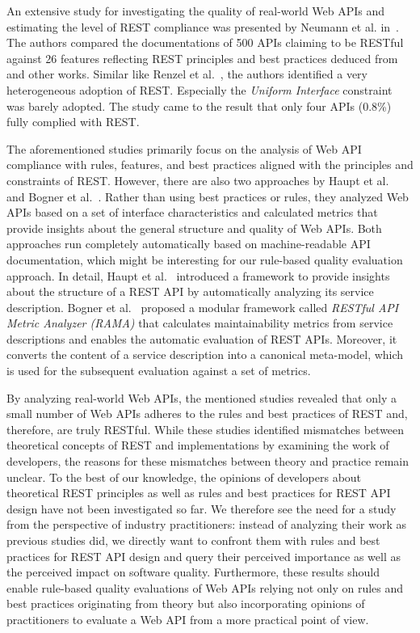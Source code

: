 \documentclass[runningheads]{llncs}
\begin{document}
An extensive study for investigating the quality of real-world Web APIs and estimating the level of REST compliance was presented by Neumann et al. in~\cite{Neumann2018}. The authors compared the documentations of 500 APIs claiming to be RESTful against 26 features reflecting REST principles and best practices deduced from~\cite{book:RestApiDesignRulebook2011,article:Palma2017,conference:Petrillo2016,conference:Renzel2012,article:Rodriguez2016} and other works. Similar like Renzel et al.~\cite{conference:Renzel2012}, the authors identified a very heterogeneous adoption of REST. Especially the \textit{Uniform Interface} constraint was barely adopted. The study came to the result that only four APIs (0.8\%) fully complied with REST.

The aforementioned studies primarily focus on the analysis of Web API compliance with rules, features, and best practices aligned with the principles and constraints of REST. However, there are also two approaches by Haupt et al.~\cite{conference:AFrameworkForTheStructuralAnalysisOfRestApis} and Bogner et al.~\cite{Bogner2020}.
Rather than using best practices or rules, they analyzed Web APIs based on a set of interface characteristics and calculated metrics that provide insights about the general structure and quality of Web APIs. Both approaches run completely automatically based on machine-readable API documentation, which might be interesting for our rule-based quality evaluation approach. In detail, Haupt et al.~\cite{conference:AFrameworkForTheStructuralAnalysisOfRestApis} introduced a framework to provide insights about the structure of a REST API by automatically analyzing its service description. Bogner et al.~\cite{Bogner2020} proposed a modular framework called \textit{RESTful API Metric Analyzer (RAMA)} that calculates maintainability metrics from service descriptions and enables the automatic evaluation of REST APIs. Moreover, it converts the content of a service description into a canonical meta-model, which is used for the subsequent evaluation against a set of metrics.

By analyzing real-world Web APIs, the mentioned studies revealed that only a small number of Web APIs adheres to the rules and best practices of REST and, therefore, are truly RESTful. While these studies identified mismatches between theoretical concepts of REST and implementations by examining the work of developers, the reasons for these mismatches between theory and practice remain unclear. To the best of our knowledge, the opinions of developers about theoretical REST principles as well as rules and best practices for REST API design have not been investigated so far. We therefore see the need for a study from the perspective of industry practitioners: instead of analyzing their work as previous studies did, we directly want to confront them with rules and best practices for REST API design and query their perceived importance as well as the perceived impact on software quality. Furthermore, these results should enable rule-based quality evaluations of Web APIs relying not only on rules and best practices originating from theory but also incorporating opinions of practitioners to evaluate a Web API from a more practical point of view.
\end{document}
